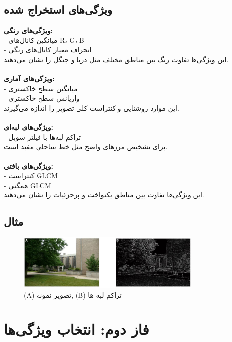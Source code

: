 \documentclass[a4paper,12pt]{article}
\let\nobreaksection\section
\renewcommand{\section}{\nobreaksection}
\begin{document}
\subsection*{\textbf{ویژگی‌های استخراج شده}}

\textbf{ویژگی‌های رنگی:}\\
- میانگین کانال‌های R، G، B  
\\
- انحراف معیار کانال‌های رنگی  
\\
این ویژگی‌ها تفاوت رنگ بین مناطق مختلف مثل دریا و جنگل را نشان می‌دهند.
\\
\\
\textbf{ویژگی‌های آماری:}\\
- میانگین سطح خاکستری  
\\
- واریانس سطح خاکستری  
\\
این موارد روشنایی و کنتراست کلی تصویر را اندازه می‌گیرند.
\\
\\
\textbf{ویژگی‌های لبه‌ای:}\\
- تراکم لبه‌ها با فیلتر سوبل  
\\
برای تشخیص مرزهای واضح مثل خط ساحلی مفید است.
\\
\\
\textbf{ویژگی‌های بافتی:}\\
- کنتراست GLCM  
\\
- همگنی GLCM  
\\
این ویژگی‌ها تفاوت بین مناطق یکنواخت و پرجزئیات را نشان می‌دهند.

\subsection*{\textbf{مثال}}

\begin{figure}[h]
	\centering
	\includegraphics[width=0.8\textwidth]{image1.png}
	\caption{(A) تصویر نمونه, (B) تراکم لبه ها }
	\label{fig:results}
\end{figure}

	
\section{فاز دوم: انتخاب ویژگی‌ها}
\end{document}
